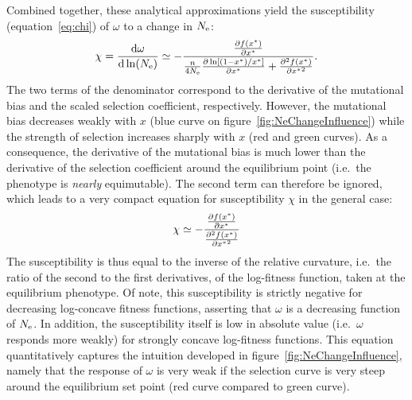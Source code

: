 Combined together, these analytical approximations yield the susceptibility (equation~\ref{eq:chi}) of $\omega$ to a change in $N_{\text{e}}$:
\begin{gather}
    \chi = \frac{ \text{d} \omega}{\text{d} \ln (N_{\text{e}})} \simeq - \frac{\frac{ \partial f (x^{*}) }{\partial {x^{*}}}}{\frac{n}{4 N_{\text{e}}} \frac{\partial \ln [ (1 - x^{*}) / x^{*} ]}{\partial x^{*} } + \frac{ \partial^2 f (x^{*}) }{\partial {x^{*}}^2}}.
\end{gather}
The two terms of the denominator correspond to the derivative of the mutational bias and the scaled selection coefficient, respectively.
However, the mutational bias decreases weakly with $x$ (blue curve on figure~\ref{fig:NeChangeInfluence}) while the strength of selection increases sharply with $x$ (red and green curves).
As a consequence, the derivative of the mutational bias is much lower than the derivative of the selection coefficient around the equilibrium point (i.e.~the \gls{phenotype} is \textit{nearly} equimutable).
The second term can therefore be ignored, which leads to a very compact equation for susceptibility $\chi$ in the general case:
\begin{gather}
    \chi \simeq - \frac{\frac{ \partial f (x^{*}) }{\partial {x^{*}}}}{\frac{ \partial^2 f (x^{*}) }{\partial {x^{*}}^2}}
\end{gather}
The susceptibility is thus equal to the inverse of the relative curvature, i.e.~the ratio of the second to the first derivatives, of the log-fitness function, taken at the equilibrium \gls{phenotype}.
Of note, this susceptibility is strictly negative for decreasing log-concave fitness functions, asserting that $\omega$ is a decreasing function of $N_{\text{e}}$.
In addition, the susceptibility itself is low in absolute value (i.e.~$\omega$ responds more weakly) for strongly concave log-fitness functions.
This equation quantitatively captures the intuition developed in figure~\ref{fig:NeChangeInfluence}, namely that the response of $\omega$ is very weak if the selection curve is very steep around the equilibrium set point (red curve compared to green curve).

